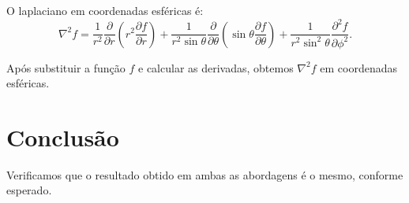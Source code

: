 \documentclass[a4paper,12pt]{article}
\begin{document}
\begin{flushleft}
O laplaciano em coordenadas esféricas é:
\begin{equation}
\nabla^2 f = \frac{1}{r^2} \frac{\partial}{\partial r}\left(r^2 \frac{\partial f}{\partial r}\right) + \frac{1}{r^2 \sin\theta} \frac{\partial}{\partial \theta}\left(\sin\theta \frac{\partial f}{\partial \theta}\right) + \frac{1}{r^2 \sin^2\theta} \frac{\partial^2 f}{\partial \phi^2}.
\end{equation}

Após substituir a função $f$ e calcular as derivadas, obtemos $\nabla^2 f$ em coordenadas esféricas.

\section{Conclusão}
Verificamos que o resultado obtido em ambas as abordagens é o mesmo, conforme esperado.

\end{flushleft}
\end{document}

